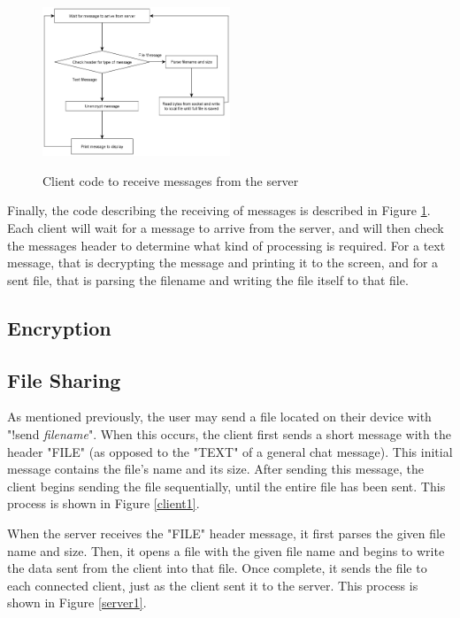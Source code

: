 \documentclass{article}
\begin{document}
\begin{figure}[h]
\caption{Client code to receive messages from the server}
\centering
\includegraphics[width=0.5\textwidth]{media/clientFlowchart3.png}
\label{client3}
\end{figure}

Finally, the code describing the receiving of messages is described in Figure \ref{client3}. Each client will wait for a message to arrive from the server, and will then check the messages header to determine what kind of processing is required. For a text message, that is decrypting the message and printing it to the screen, and for a sent file, that is parsing the filename and writing the file itself to that file.

\subsection{Encryption}


\subsection{File Sharing}

As mentioned previously, the user may send a file located on their device with "!send \emph{filename}". When this occurs, the client first sends a short message with the header "FILE" (as opposed to the "TEXT" of a general chat message). This initial message contains the file's name and its size. After sending this message, the client begins sending the file sequentially, until the entire file has been sent. This process is shown in Figure \ref{client1}.

When the server receives the "FILE" header message, it first parses the given file name and size. Then, it opens a file with the given file name and begins to write the data sent from the client into that file. Once complete, it sends the file to each connected client, just as the client sent it to the server. This process is shown in Figure \ref{server1}.
\end{document}
